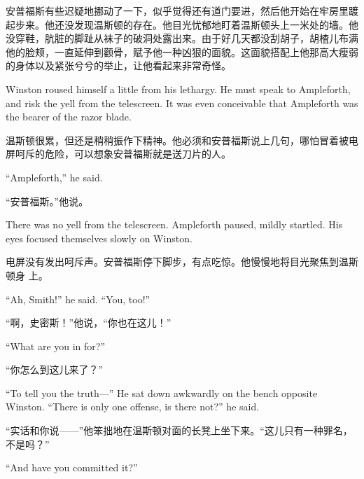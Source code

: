 \begin{paracol}{2}
\switchcolumn

安普福斯有些迟疑地挪动了一下，似乎觉得还有道门要进，然后他开始在牢房里踱起步来。他还没发现温斯顿的存在。他目光忧郁地盯着温斯顿头上一米处的墙。他没穿鞋，肮脏的脚趾从袜子的破洞处露出来。由于好几天都没刮胡子，胡楂儿布满他的脸颊，一直延伸到颧骨，赋予他一种凶狠的面貌。这面貌搭配上他那高大瘦弱的身体以及紧张兮兮的举止，让他看起来非常奇怪。

\switchcolumn*

Winston roused himself a little from his lethargy. He must speak to
Ampleforth, and risk the yell from the telescreen. It was even
conceivable that Ampleforth was the bearer of the razor blade.

\switchcolumn

温斯顿很累，但还是稍稍振作下精神。他必须和安普福斯说上几句，哪怕冒着被电屏呵斥的危险，可以想象安普福斯就是送刀片的人。

\switchcolumn*

``Ampleforth,'' he said.

\switchcolumn

``安普福斯。''他说。

\switchcolumn*

There was no yell from the telescreen. Ampleforth paused, mildly
startled. His eyes focused themselves slowly on Winston.

\switchcolumn

电屏没有发出呵斥声。安普福斯停下脚步，有点吃惊。他慢慢地将目光聚焦到温斯顿身
上。

\switchcolumn*

``Ah, Smith!'' he said. ``You, too!''

\switchcolumn

``啊，史密斯！''他说，``你也在这儿！''

\switchcolumn*

``What are you in for?''

\switchcolumn

``你怎么到这儿来了？''

\switchcolumn*

``To tell you the truth---'' He sat down awkwardly on the bench opposite
Winston. ``There is only one offense, is there not?'' he said.

\switchcolumn

``实话和你说——''他笨拙地在温斯顿对面的长凳上坐下来。``这儿只有一种罪名，不是吗？''

\switchcolumn*

``And have you committed it?''


\end{paracol}
